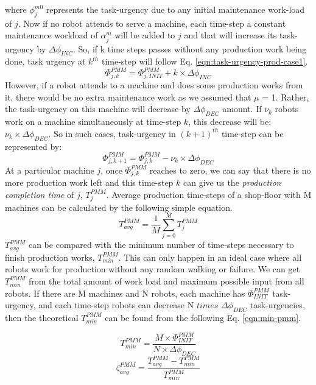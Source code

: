 \documentclass{llncs}
\begin{document}
where $\phi_{j}^{m0}$ represents the task-urgency due to any initial maintenance work-load of $j$.
Now if no robot attends to serve a machine, each time-step a constant maintenance workload of $\alpha_{j}^{m}$ will be added to $j$ and that will increase its task-urgency by $\Delta \phi_{INC}$. So, if k time steps passes without any production work being done, task urgency at $k^{th}$ time-step will follow Eq. \ref{eqn:task-urgency-prod-case1}.
\begin{equation}
\Phi_{j, k}^{PMM} =\Phi_{j, INIT}^{PMM} + k \times \Delta \phi_{INC}
\label{eqn:task-urgency-prod-case1}
\end{equation}
However, if a robot attends to a machine and does some production works from it, there would be no extra maintenance work as we assumed that $\mu$ = 1. Rather, the task-urgency on this machine will decrease by $\Delta \phi_{DEC}$ amount. If $\nu_{k}$ robots work on a machine simultaneously at time-step $k$, this decrease will be: $\nu_{k} \times \Delta \phi_{DEC}$. So in such cases, task-urgency in $(k+1)^{th}$ time-step can be represented by:
\begin{equation}
\Phi_{j, k+1}^{PMM} = \Phi_{j, k}^{PMM} - \nu_{k} \times \Delta \phi_{DEC}
\label{eqn:task-urgency-prod-case2}
\end{equation}
At a particular machine $j$, once $\Phi_{j, k}^{PMM}$ reaches to zero, we can say that there is no more production work left and this time-step $k$ can give us the {\em production completion time} of $j$, $T_{j}^{PMM}$. Average production time-steps of a shop-floor with M machines can be calculated by the following simple equation.
\begin{equation}
T_{avg}^{PMM} = \frac{1}{M} \sum_{j=0}^{M} T_{j}^{PMM} 
\label{eqn:avg-pmm}
\end{equation}
$T_{avg}^{PMM}$ can be compared with the minimum number of time-steps necessary to finish production works, $T_{min}^{PMM}$. This can only happen in an ideal case where all robots work for production without any random walking or failure. We can get $T_{min}^{PMM}$ from the total amount of work load and maximum possible input from all robots. If there are M machines and N robots, each machine has $\Phi_{INIT}^{PMM}$ task-urgency, and each time-step robots can decrease N $times$ $\Delta \phi_{DEC}$ task-urgencies, then the theoretical $T_{min}^{PMM}$ can be found from the following Eq. \ref{eqn:min-pmm}.
%
\begin{multicols}{2}
\small
\begin{equation}
T_{min}^{PMM} = \frac{M \times \Phi_{INIT}^{PMM}}{N \times \Delta \phi_{DEC}} 
\label{eqn:min-pmm}
\end{equation}
\vspace*{0.2cm}
\begin{equation}
\zeta_{avg}^{PMM} = \frac{T_{avg}^{PMM} - T_{min}^{PMM}}{T_{min}^{PMM}} 
\label{eqn:appd}
\end{equation}
\end{multicols}
\end{document}
